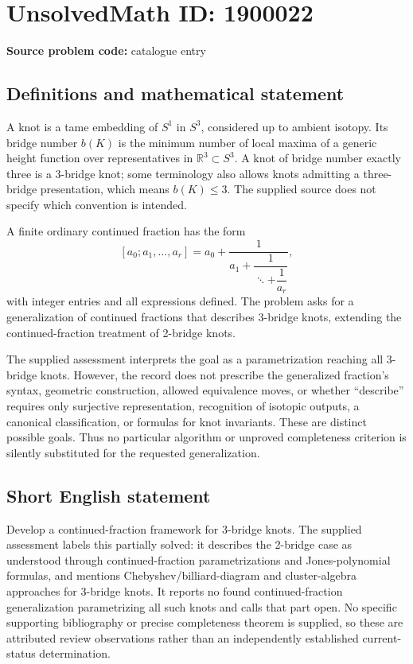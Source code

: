 \documentclass[11pt]{article}
\newcommand{\R}{\mathbb{R}}
\begin{document}
\section*{UnsolvedMath ID: 1900022}
\textbf{Source problem code:} catalogue entry
\subsection{Definitions and mathematical statement}
A knot is a tame embedding of $S^1$ in $S^3$, considered up to ambient isotopy. Its bridge number $b(K)$ is the minimum number of local maxima of a generic height function over representatives in $\R^3\subset S^3$. A knot of bridge number exactly three is a 3-bridge knot; some terminology also allows knots admitting a three-bridge presentation, which means $b(K)\leq3$. The supplied source does not specify which convention is intended.

A finite ordinary continued fraction has the form
\[
 [a_0;a_1,\ldots,a_r]
 =a_0+\frac1{a_1+\dfrac1{\ddots+\dfrac1{a_r}}},
\]
with integer entries and all expressions defined. The problem asks for a generalization of continued fractions that describes 3-bridge knots, extending the continued-fraction treatment of 2-bridge knots.

The supplied assessment interprets the goal as a parametrization reaching all 3-bridge knots. However, the record does not prescribe the generalized fraction's syntax, geometric construction, allowed equivalence moves, or whether ``describe'' requires only surjective representation, recognition of isotopic outputs, a canonical classification, or formulas for knot invariants. These are distinct possible goals. Thus no particular algorithm or unproved completeness criterion is silently substituted for the requested generalization.
\subsection{Short English statement}
Develop a continued-fraction framework for 3-bridge knots. The supplied assessment labels this partially solved: it describes the 2-bridge case as understood through continued-fraction parametrizations and Jones-polynomial formulas, and mentions Chebyshev/billiard-diagram and cluster-algebra approaches for 3-bridge knots. It reports no found continued-fraction generalization parametrizing all such knots and calls that part open. No specific supporting bibliography or precise completeness theorem is supplied, so these are attributed review observations rather than an independently established current-status determination.
\end{document}
